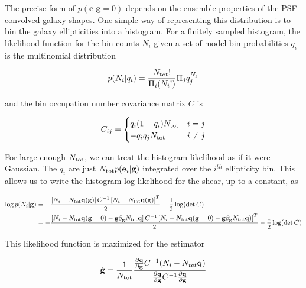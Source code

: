 \documentclass[iop]{emulateapj}
\begin{document}
The precise form of $p(\mathbf{e}|\mathbf{g}=0)$ depends on the ensemble properties
of the PSF-convolved galaxy shapes. One simple way of representing this
distribution is to bin the galaxy ellipticities into a histogram. For
a finitely sampled histogram, the likelihood function for the bin
counts $N_i$ given a set of model bin probabilities $q_i$ is the
multinomial distribution

\begin{equation}
p( N_i | q_i) = \frac{N_{\rm tot} !}{\Pi_i (N_i!)}\Pi_j q^{N_j}_j
\end{equation}

and the bin occupation number covariance matrix $C$ is

\begin{equation}
C_{ij}= \begin{cases}
q_i ( 1 - q_i) N_{\rm tot} &  i=j\\
-q_i q_j N_{\rm tot} &  i \ne j
\end{cases}
\end{equation}

For large enough $N_{\rm tot}$, we can treat the histogram likelihood as
if it were Gaussian. The $q_i$ are just $N_{\rm tot} p(\mathbf{e}_i|\mathbf{g})$
integrated over the $i^{th}$ ellipticity bin. This allows us to
write the histogram log-likelihood for the shear, up to a constant, as

\begin{widetext}
\begin{align}
  \log p(N_i | \mathbf{g} ) &= -\frac{\left[N_i - N_{\rm tot} \mathbf{q} (\mathbf{g})
                              \right]C^{-1} \left[N_i - N_{\rm tot} \mathbf{q}
                              (\mathbf{g}) \right]^T}{2} -
                              \frac{1}{2}\log(\det{}C) \\
                            & = -\frac{\left[N_i - N_{\rm tot} \mathbf{q} (\mathbf{g}=0) - \mathbf{g} \partial_\mathbf{g}
                              N_{\rm tot} \mathbf{q} \right]C^{-1} \left[N_i - N_{\rm tot} \mathbf{q} (\mathbf{g}=0) -
                              \mathbf{g} \partial_\mathbf{g} N_{\rm tot}
                              \mathbf{q}) \right]^T}{2} -\frac{1}{2}\log(\det{}C)
\end{align}
\end{widetext}
This likelihood function is maximized for the estimator

\begin{align}
  \hat{\mathbf{g}} = \frac{1}{N_{\rm tot}}\frac{\frac{\partial \mathbf{q}}{\partial {\mathbf{g}}} C^{-1} (N_i -  N_{tot }\mathbf{q})}{\frac{\partial \mathbf{q}}{\partial {\mathbf{g}}} C^{-1} \frac{\partial \mathbf{q}}{\partial {\mathbf{g}}}}
\end{align}
\end{document}
